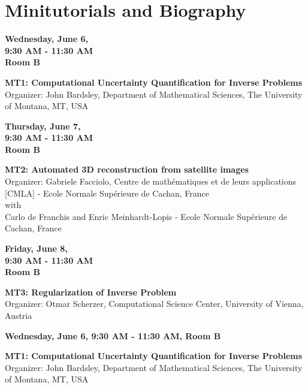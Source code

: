 \newpage
\chapter*{Minitutorials and Biography}

\begin{center}\textbf{Wednesday, June 6, \\9:30 AM - 11:30 AM \\Room B}\end{center}
\begin{center}
\textbf{MT1: Computational Uncertainty Quantification for Inverse Problems}\\
Organizer: John Bardsley, Department of Mathematical Sciences, The University of Montana, MT, USA
\end{center}

\vspace{1cm}
\begin{center}\textbf{Thursday, June 7, \\9:30 AM - 11:30 AM \\Room B}\end{center}
\begin{center}
\textbf{MT2: Automated 3D reconstruction from satellite images}\\
Organizer: Gabriele Facciolo, Centre de math\'ematiques et de leurs applications [CMLA] - Ecole Normale Sup\'erieure de Cachan, France\\
with\\ Carlo de Franchis and Enric Meinhardt-Lopis - Ecole Normale Sup\'erieure de Cachan, France
\end{center}
\vspace{1cm}
\begin{center}\textbf{Friday, June 8, \\9:30 AM - 11:30 AM \\Room B}\end{center}
\begin{center}
\textbf{MT3: Regularization of Inverse Problem}\\
Organizer: Otmar Scherzer, Computational Science Center, University of Vienna, Austria
\end{center}

\newpage
\begin{center}\textbf{Wednesday, June 6, 9:30 AM - 11:30 AM, Room B}\end{center}
\begin{center}
\textbf{MT1: Computational Uncertainty Quantification for Inverse Problems}\\
Organizer: John Bardsley, Department of Mathematical Sciences, The University of Montana, MT, USA
\end{center}

